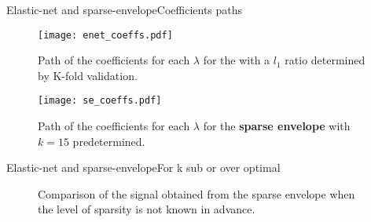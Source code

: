 \documentclass[10pt,aspectratio=43]{beamer}
\begin{document}

\begin{frame}{Elastic-net and sparse-envelope}{Coefficients paths}
\begin{center}
\begin{figure}
  \begin{minipage}[c]{0.67\textwidth}
   \texttt{[image: enet\_coeffs.pdf]}
   \end{minipage}\hfill
  \begin{minipage}[c]{0.3\textwidth}
    \caption{
   Path of the coefficients for each $\lambda$ for the \enet with a $l_1$ ratio determined by K-fold validation.
    }
  \end{minipage}
\end{figure}

\begin{figure}
  \begin{minipage}[c]{0.67\textwidth}
   \texttt{[image: se\_coeffs.pdf]}
   \end{minipage}\hfill
  \begin{minipage}[c]{0.3\textwidth}
    \caption{
      Path of the coefficients for each $\lambda$ for the \textbf{sparse envelope} with $k=15$ predetermined.
    }
  \end{minipage}
\end{figure}
\end{center}
\end{frame}

\begin{frame}{Elastic-net and sparse-envelope}{For k sub or over optimal}
\begin{figure}
    \captionsetup[subfigure]{labelformat=empty}

\caption{Comparison of the signal obtained from the sparse envelope when the level of sparsity is not known in advance.}
\end{figure}
\end{frame}
\end{document}
